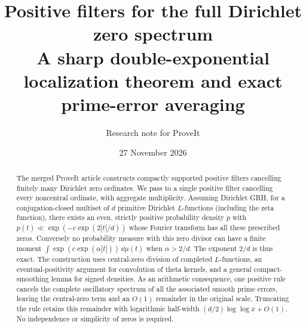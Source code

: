 \documentclass[11pt]{article}
\title{Positive filters for the full Dirichlet zero spectrum\\\large A sharp double-exponential localization theorem and exact prime-error averaging}
\author{Research note for ProveIt}
\date{27 November 2026}
\theoremstyle{remark}\newtheorem{remark}[theorem]{Remark}
\begin{document}
\maketitle
\begin{abstract}
The merged ProveIt article constructs compactly supported positive filters cancelling finitely many Dirichlet zero ordinates. We pass to a single positive filter cancelling every noncentral ordinate, with aggregate multiplicity. Assuming Dirichlet GRH, for a conjugation-closed multiset of $d$ primitive Dirichlet $L$-functions (including the zeta function), there exists an even, strictly positive probability density $p$ with
$p(t)\ll \exp(-c\exp(2|t|/d))$ whose Fourier transform has all these prescribed zeros. Conversely no probability measure with this zero divisor can have a finite moment $\int\exp(c\exp(\alpha|t|))\,\dd\mu(t)$ when $\alpha>2/d$. The exponent $2/d$ is thus exact. The construction uses central-zero division of completed $L$-functions, an eventual-positivity argument for convolution of theta kernels, and a general compact-smoothing lemma for signed densities. As an arithmetic consequence, one positive rule cancels the complete oscillatory spectrum of all the associated smooth prime errors, leaving the central-zero term and an $O(1)$ remainder in the original scale. Truncating the rule retains this remainder with logarithmic half-width $(d/2)\log\log x+O(1)$. No independence or simplicity of zeros is required.
\end{abstract}
\end{document}
